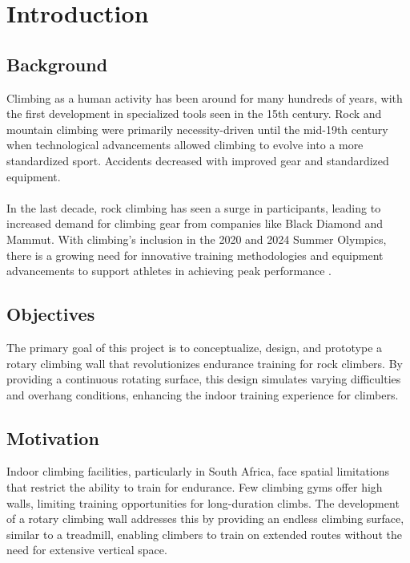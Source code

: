 \chapter{Introduction}

\section{Background}
Climbing as a human activity has been around for many hundreds of years, with the first development in specialized tools seen in the 15th century. Rock and mountain climbing were primarily necessity-driven until the mid-19th century when technological advancements allowed climbing to evolve into a more standardized sport. Accidents decreased with improved gear and standardized equipment. \\\\
In the last decade, rock climbing has seen a surge in participants, leading to increased demand for climbing gear from companies like Black Diamond and Mammut. With climbing’s inclusion in the 2020 and 2024 Summer Olympics, there is a growing need for innovative training methodologies and equipment advancements to support athletes in achieving peak performance \citep{Consuegra-2023}.

\section{Objectives}
The primary goal of this project is to conceptualize, design, and prototype a rotary climbing wall that revolutionizes endurance training for rock climbers. By providing a continuous rotating surface, this design simulates varying difficulties and overhang conditions, enhancing the indoor training experience for climbers.

\section{Motivation}
Indoor climbing facilities, particularly in South Africa, face spatial limitations that restrict the ability to train for endurance. Few climbing gyms offer high walls, limiting training opportunities for long-duration climbs. The development of a rotary climbing wall addresses this by providing an endless climbing surface, similar to a treadmill, enabling climbers to train on extended routes without the need for extensive vertical space.

